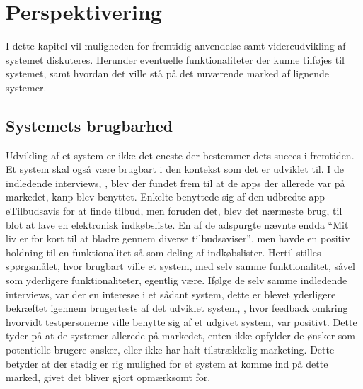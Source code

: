 \chapter{Perspektivering}
I dette kapitel vil muligheden for fremtidig anvendelse samt videreudvikling af systemet diskuteres.
Herunder eventuelle funktionaliteter der kunne tilføjes til systemet, samt hvordan det ville stå på det nuværende marked af lignende systemer.

\section{Systemets brugbarhed}
Udvikling af et system er ikke det eneste der bestemmer dets succes i fremtiden.
Et system skal også være brugbart i den kontekst som det er udviklet til.
I de indledende interviews, , blev der fundet frem til at de apps der allerede var på markedet, kanp blev benyttet.
Enkelte benyttede sig af den udbredte app eTilbudsavis for at finde tilbud, men foruden det, blev det nærmeste brug, til blot at lave en elektronisk indkøbsliste.
En af de adspurgte nævnte endda ``Mit liv er for kort til at bladre gennem diverse tilbudsaviser'', men havde en positiv holdning til en funktionalitet så som deling af indkøbslister.
Hertil stilles spørgsmålet, hvor brugbart ville et system, med selv samme funktionalitet, såvel som yderligere funktionaliteter, egentlig være.
Ifølge de selv samme indledende interviews, var der en interesse i et sådant system, dette er blevet yderligere bekræftet igennem brugertests af det udviklet system, , hvor feedback omkring hvorvidt testpersonerne ville benytte sig af et udgivet system, var positivt.
Dette tyder på at de systemer allerede på markedet, enten ikke opfylder de ønsker som potentielle brugere ønsker, eller ikke har haft tilstrækkelig marketing.
Dette betyder at der stadig er rig mulighed for et system at komme ind på dette marked, givet det bliver gjort opmærksomt for.

